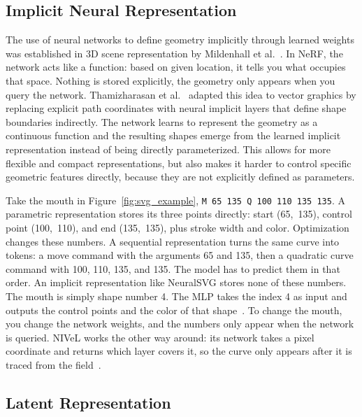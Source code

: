 \subsection{Implicit Neural Representation}
\label{sec:implicit_repr}

The use of neural networks to define geometry implicitly 
through learned weights was established in 
3D scene representation by Mildenhall et 
al.~\cite{mildenhallNeRFRepresentingScenes2020}. In NeRF,
the network acts like a function: based on given location,
it tells you what occupies that 
space. Nothing is stored explicitly, the geometry 
only appears when you query the network.
Thamizharasan et 
al.~\cite{thamizharasanNIVeLNeuralImplicit2024} adapted this 
idea to vector graphics by replacing explicit path coordinates 
with neural implicit layers that define shape boundaries 
indirectly. The network learns to represent the geometry as a continuous 
function and the resulting shapes emerge from the learned implicit representation 
instead of being directly parameterized. This allows for more flexible and 
compact representations, but also makes it harder to control specific 
geometric features directly, because they are not explicitly defined as 
parameters.   

Take the mouth 
in Figure~\ref{fig:svg_example}, \texttt{M 65 135 Q 100 110 135 135}. 
A parametric representation stores its three points directly: start 
(65,~135), control point (100,~110), and end (135,~135), plus stroke 
width and color. Optimization changes these numbers. A sequential 
representation turns the same curve into tokens: a move command with 
the arguments 65 and 135, then a quadratic curve command with 100, 110, 
135, and 135. The model has to predict them in that order. An implicit 
representation like NeuralSVG stores none of these numbers. The mouth 
is simply shape number 4. The MLP takes the index 4 as input and 
outputs the control points and the color of that 
shape~\cite{polaczekNeuralSVGImplicitRepresentation2025}. To change 
the mouth, you change the network weights, and the numbers only appear 
when the network is queried. NIVeL works the other way around: its network 
takes a pixel coordinate and returns which layer covers it, so the 
curve only appears after it is traced from the 
field~\cite{thamizharasanNIVeLNeuralImplicit2024}.


\subsection{Latent Representation}
\label{sec:latent_repr}

